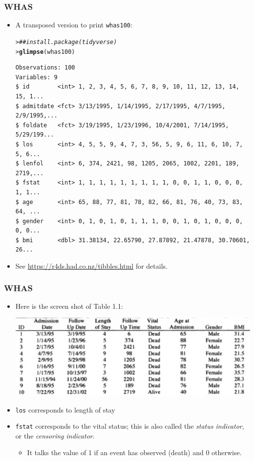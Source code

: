 \documentclass[10pt]{beamer}\usepackage[]{graphicx}\usepackage[]{color}
\makeatletter
\newcommand{\hlcom}[1]{\textcolor[rgb]{0.678,0.584,0.686}{\textit{#1}}}%
\newcommand{\hlstd}[1]{\textcolor[rgb]{0.345,0.345,0.345}{#1}}%
\newcommand{\hlkwd}[1]{\textcolor[rgb]{0.737,0.353,0.396}{\textbf{#1}}}%
\newenvironment{kframe}{%
 \def\at@end@of@kframe{}%
 \ifinner\ifhmode%
  \def\at@end@of@kframe{\end{minipage}}%
  \begin{minipage}{\columnwidth}%
 \fi\fi%
 \def\FrameCommand##1{\hskip\@totalleftmargin \hskip-\fboxsep
 \colorbox{shadecolor}{##1}\hskip-\fboxsep
     \hskip-\linewidth \hskip-\@totalleftmargin \hskip\columnwidth}%
 \MakeFramed {\advance\hsize-\width
   \@totalleftmargin\z@ \linewidth\hsize
   \@setminipage}}%
 {\par\unskip\endMakeFramed%
 \at@end@of@kframe}
\newenvironment{knitrout}{}{} %
\renewenvironment{knitrout}{\setlength{\topsep}{-.2mm}}{}
\newcommand{\empr}[1]{{\emph{\color{red}#1}}}
\makeatother
\begin{document}
\begin{frame}[fragile]
\frametitle{WHAS}
  \begin{itemize}
  \item A transposed version to print \texttt{whas100}:
\begin{knitrout}\scriptsize
{}\color{fgcolor}\begin{kframe}
\begin{alltt}
\hlstd{> }\hlcom{## install.package(tidyverse)}
\hlstd{> }\hlkwd{glimpse}\hlstd{(whas100)}
\end{alltt}
\begin{verbatim}
Observations: 100
Variables: 9
$ id        <int> 1, 2, 3, 4, 5, 6, 7, 8, 9, 10, 11, 12, 13, 14, 15, 1...
$ admitdate <fct> 3/13/1995, 1/14/1995, 2/17/1995, 4/7/1995, 2/9/1995,...
$ foldate   <fct> 3/19/1995, 1/23/1996, 10/4/2001, 7/14/1995, 5/29/199...
$ los       <int> 4, 5, 5, 9, 4, 7, 3, 56, 5, 9, 6, 11, 6, 10, 7, 5, 6...
$ lenfol    <int> 6, 374, 2421, 98, 1205, 2065, 1002, 2201, 189, 2719,...
$ fstat     <int> 1, 1, 1, 1, 1, 1, 1, 1, 1, 0, 0, 1, 1, 0, 0, 0, 1, 1...
$ age       <int> 65, 88, 77, 81, 78, 82, 66, 81, 76, 40, 73, 83, 64, ...
$ gender    <int> 0, 1, 0, 1, 0, 1, 1, 1, 0, 0, 1, 0, 1, 0, 0, 0, 0, 0...
$ bmi       <dbl> 31.38134, 22.65790, 27.87892, 21.47878, 30.70601, 26...
\end{verbatim}
\end{kframe}
\end{knitrout}
  \item See \url{https://r4ds.had.co.nz/tibbles.html} for details.
  \end{itemize}
\end{frame}

\begin{frame}[fragile]
\frametitle{WHAS}
  \begin{itemize}
  \item Here is the screen shot of Table 1.1:
    \begin{center}
      \includegraphics[trim = 0 0 0 .1cm, clip, scale = .45]{tab1-1}
    \end{center}
  \item \texttt{los} corresponds to length of stay
  \item \texttt{fstat} corresponds to the vital status; this is also called the \empr{status indicator}, 
    or the \empr{censoring indicator}.
    \begin{itemize}
    \item It talks the value of 1 if an event has observed (death) and 0 otherwise.
    \end{itemize}
  \end{itemize}
\end{frame}
\end{document}
